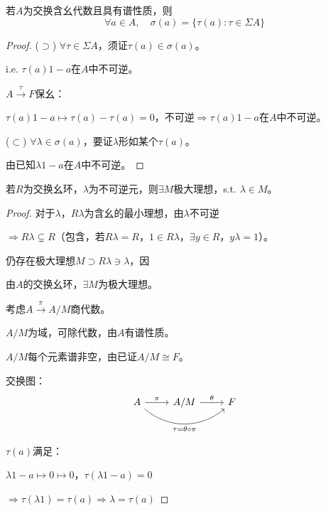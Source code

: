 \documentclass[lang=cn,a4paper,newtx,section]{elegantbook}
\begin{document}
\begin{theorem}
  若$A$为交换含幺代数且具有谱性质，则
  \begin{equation*}
    \forall a \in A, \quad \sigma(a) = \{\tau(a) : \tau \in \Sigma A\}
  \end{equation*}
\end{theorem}

\begin{proof}
  ($\supset$) $\forall \tau \in \Sigma A$，须证$\tau(a) \in \sigma(a)$。
  
  i.e. $\tau(a)1 - a$在$A$中不可逆。
  
  $A \xrightarrow{\tau} F$保幺：
  
  $\tau(a)1 - a \longmapsto \tau(a) - \tau(a) = 0$，不可逆$\Rightarrow \tau(a)1 - a$在$A$中不可逆。
  
  ($\subset$) $\forall \lambda \in \sigma(a)$，要证$\lambda$形如某个$\tau(a)$。
  
  由已知$\lambda 1 - a$在$A$中不可逆。
\end{proof}

\begin{remark}
  若$R$为交换幺环，$\lambda$为不可逆元，则$\exists M$极大理想，s.t. $\lambda \in M$。
\end{remark}

\begin{proof}
  对于$\lambda$，$R\lambda$为含幺的最小理想，由$\lambda$不可逆
  
  $\Rightarrow R\lambda \subsetneq R$（包含，若$R\lambda = R$，$1 \in R\lambda$，$\exists y \in R$，$y\lambda = 1$）。
  
  仍存在极大理想$M \supset R\lambda \ni \lambda$，因
  
  由$A$的交换幺环，$\exists M$为极大理想。
  
  考虑$A \xrightarrow{\pi} A/M$商代数。
  
  $A/M$为域，可除代数，由$A$有谱性质。
  
  $A/M$每个元素谱非空，由已证$A/M \cong F$。
  
  交换图：
  \begin{equation*}
    \begin{tikzcd}
      A \arrow[r, "\pi"] \arrow[rr, bend right=40, "\tau = \theta \circ \pi"'] & A/M \arrow[r, "\theta"] & F
    \end{tikzcd}
  \end{equation*}
  
  $\tau(a)$满足：
  
  $\lambda 1 - a \longmapsto 0 \longmapsto 0$，$\tau(\lambda 1 - a) = 0$
  
  $\Rightarrow \tau(\lambda 1) = \tau(a) \Rightarrow \lambda = \tau(a)$
\end{proof}
\end{document}
